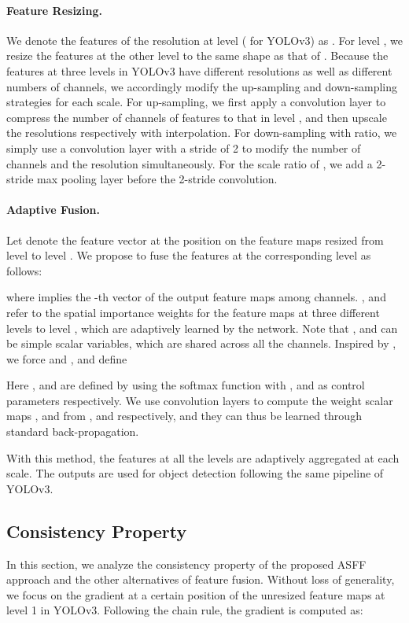 \documentclass[10pt,twocolumn,letterpaper]{article}
\begin{document}
\paragraph{Feature Resizing.} We denote the features of the resolution at level  ( for YOLOv3) as . For level , we resize the features  at the other level  to the same shape as that of . Because the features at three levels in YOLOv3 have different resolutions as well as different numbers of channels, we accordingly modify the up-sampling and down-sampling strategies for each scale. For up-sampling, we first apply a  convolution layer to compress the number of channels of features to that in level , and then upscale the resolutions respectively with interpolation. For down-sampling with  ratio, we simply use a  convolution layer with a stride of 2 to modify the number of channels and the resolution simultaneously. For the scale ratio of , we add a 2-stride max pooling layer before the 2-stride convolution.

\paragraph{Adaptive Fusion.} Let  denote the feature vector at the position  on the feature maps resized from level  to level . We propose to fuse the features at the corresponding level  as follows:

where  implies the -th vector of the output feature maps  among channels. ,  and  refer to the spatial importance weights for the feature maps at three different levels to level , which are adaptively learned by the network. Note that ,  and  can be simple scalar variables, which are shared across all the channels. Inspired by \cite{acnet}, we force  and , and define
\begin{small}\end{small}
Here ,  and  are defined by using the softmax function with ,  and  as control parameters respectively. We use  convolution layers to compute the weight scalar maps ,  and  from ,  and  respectively, and they can thus be learned through standard back-propagation.

With this method, the features at all the levels are adaptively aggregated at each scale. The outputs  are used for object detection following the same pipeline of YOLOv3.

\subsection{Consistency Property}
In this section, we analyze the consistency property of the proposed ASFF approach and the other alternatives of feature fusion. Without loss of generality, we focus on the gradient at a certain position  of the unresized feature maps at level 1  in YOLOv3. Following the chain rule, the gradient is computed as:
 
\end{document}
